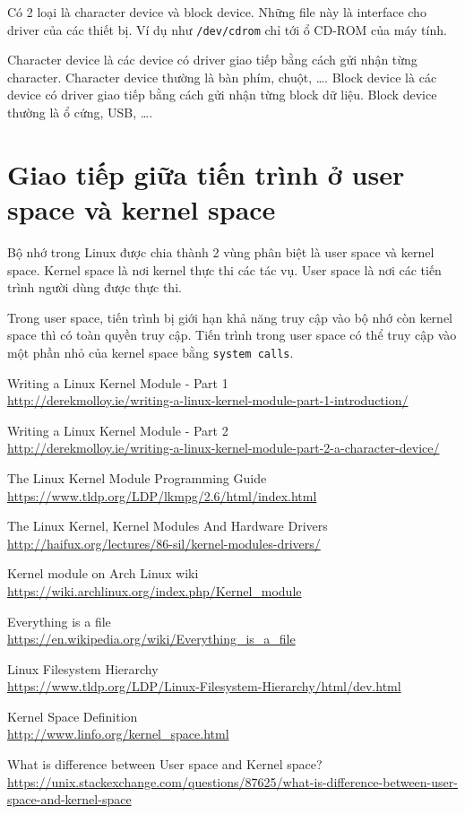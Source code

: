 \documentclass[12pt]{article}
\begin{document}
Có 2 loại là character device và block device. Những file này là interface cho driver của các thiết bị. Ví dụ như \texttt{/dev/cdrom} chỉ tới ổ CD-ROM của máy tính. 

Character device là các device có driver giao tiếp bằng cách gửi nhận từng character. Character device thường là bàn phím, chuột, \dots . Block device là các device có driver giao tiếp bằng cách gửi nhận từng block dữ liệu. Block device thường là ổ cứng, USB, \dots .

\section{Giao tiếp giữa tiến trình ở user space và kernel space}

Bộ nhớ trong Linux được chia thành 2 vùng phân biệt là user space và kernel space. Kernel space là nơi kernel thực thi các tác vụ. User space là nơi các tiến trình người dùng được thực thi. 

Trong user space, tiến trình bị giới hạn khả năng truy cập vào bộ nhớ còn kernel space thì có toàn quyền truy cập.  Tiến trình trong user space  có thể truy cập vào một phần nhỏ của kernel space bằng \texttt{system calls}.

\begin{thebibliography}{1}

 Writing a Linux Kernel Module - Part 1 \\
\url{http://derekmolloy.ie/writing-a-linux-kernel-module-part-1-introduction/}

  Writing a Linux Kernel Module - Part 2 \\
\url{http://derekmolloy.ie/writing-a-linux-kernel-module-part-2-a-character-device/}

 The Linux Kernel Module Programming Guide \\
\url{https://www.tldp.org/LDP/lkmpg/2.6/html/index.html}

 The Linux Kernel, Kernel Modules And Hardware Drivers \\
\url{http://haifux.org/lectures/86-sil/kernel-modules-drivers/}

 Kernel module on Arch Linux wiki \\
\url{https://wiki.archlinux.org/index.php/Kernel_module}

 Everything is a file \\
\url{https://en.wikipedia.org/wiki/Everything_is_a_file}

 Linux Filesystem Hierarchy \\
\url{https://www.tldp.org/LDP/Linux-Filesystem-Hierarchy/html/dev.html}

 Kernel Space Definition \\
\url{http://www.linfo.org/kernel_space.html}

 What is difference between User space and Kernel space? \\
\url{https://unix.stackexchange.com/questions/87625/what-is-difference-between-user-space-and-kernel-space}

\end{thebibliography}
\end{document}
